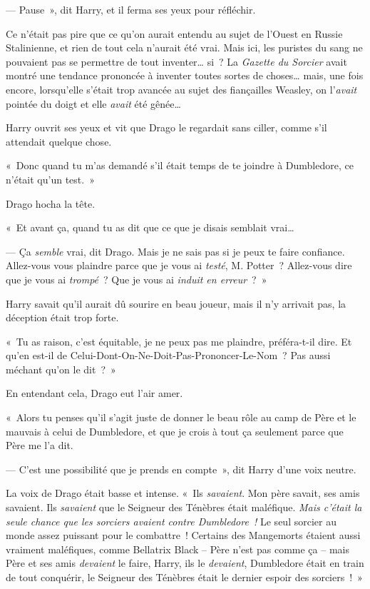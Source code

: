 --- Pause~», dit Harry, et il ferma ses yeux pour réfléchir.

Ce n'était pas pire que ce qu'on aurait entendu au sujet de l'Ouest en Russie Stalinienne, et rien de tout cela n'aurait été vrai. Mais ici, les puristes du sang ne pouvaient pas se permettre de tout inventer… si~? La \emph{Gazette du Sorcier} avait montré une tendance prononcée à inventer toutes sortes de choses… mais, une fois encore, lorsqu'elle s'était trop avancée au sujet des fiançailles Weasley, on l'\emph{avait} pointée du doigt et elle \emph{avait} été gênée…

Harry ouvrit ses yeux et vit que Drago le regardait sans ciller, comme s'il attendait quelque chose.

«~Donc quand tu m'as demandé s'il était temps de te joindre à Dumbledore, ce n'était qu'un test.~»

Drago hocha la tête.

«~Et avant ça, quand tu as dit que ce que je disais semblait vrai…

--- Ça \emph{semble} vrai, dit Drago. Mais je ne sais pas si je peux te faire confiance. Allez-vous vous plaindre parce que je vous ai \emph{testé}, M. Potter~? Allez-vous dire que je vous ai \emph{trompé}~? Que je vous ai \emph{induit en erreur}~?~»

Harry savait qu'il aurait dû sourire en beau joueur, mais il n'y arrivait pas, la déception était trop forte.

«~Tu as raison, c'est équitable, je ne peux pas me plaindre, préféra-t-il dire. Et qu'en est-il de Celui-Dont-On-Ne-Doit-Pas-Prononcer-Le-Nom~? Pas aussi méchant qu'on le dit~?~»

En entendant cela, Drago eut l'air amer.

«~Alors tu penses qu'il s'agit juste de donner le beau rôle au camp de Père et le mauvais à celui de Dumbledore, et que je crois à tout ça seulement parce que Père me l'a dit.

--- C'est une possibilité que je prends en compte~», dit Harry d'une voix neutre.

La voix de Drago était basse et intense. «~Ils \emph{savaient}. Mon père savait, ses amis savaient. Ils \emph{savaient} que le Seigneur des Ténèbres était maléfique. \emph{Mais c'était la seule chance que les sorciers avaient contre Dumbledore~!} Le seul sorcier au monde assez puissant pour le combattre~! Certains des Mangemorts étaient aussi vraiment maléfiques, comme Bellatrix Black -- Père n'est pas comme ça -- mais Père et ses amis \emph{devaient} le faire, Harry, ils le \emph{devaient}, Dumbledore était en train de tout conquérir, le Seigneur des Ténèbres était le dernier espoir des sorciers~!~»

